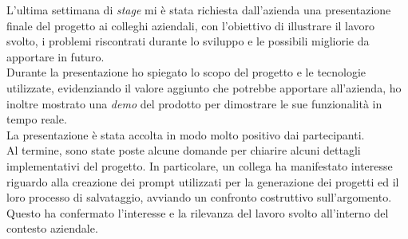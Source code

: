 L'ultima settimana di \textit{stage} mi è stata richiesta dall'azienda una presentazione finale del progetto ai colleghi aziendali, con l'obiettivo di illustrare il lavoro svolto, i problemi riscontrati durante lo sviluppo e le possibili migliorie da apportare in futuro.\\

\noindent Durante la presentazione ho spiegato lo scopo del progetto e le tecnologie utilizzate, evidenziando il valore aggiunto che potrebbe apportare all'azienda, ho inoltre mostrato una \textit{demo} del prodotto per dimostrare le sue funzionalità in tempo reale.\\  

\noindent La presentazione è stata accolta in modo molto positivo dai partecipanti. \\Al termine, sono state poste alcune domande per chiarire alcuni dettagli implementativi del progetto. In particolare, un collega ha manifestato interesse riguardo alla creazione dei \gls{prompt} utilizzati per la generazione dei progetti ed il loro processo di salvataggio, avviando un confronto costruttivo sull’argomento.\\
Questo ha confermato l’interesse e la rilevanza del lavoro svolto all'interno del contesto aziendale.

